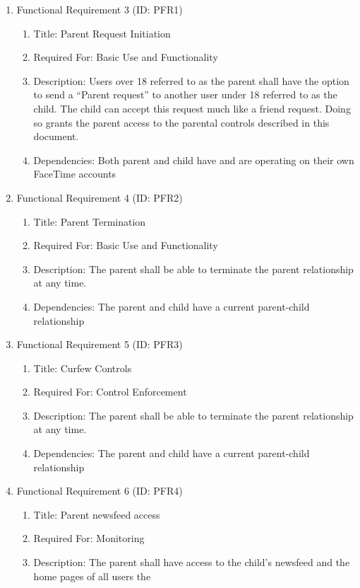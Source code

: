 \documentclass[12pt]{article}
\begin{document}
\begin{enumerate}
    \item Functional Requirement 3 (ID: PFR1)
    \begin{enumerate}
        \item Title: Parent Request Initiation
        \item Required For: Basic Use and Functionality
        \item Description: Users over 18 referred to as the parent shall have the option to send a “Parent request”
        to another user under 18 referred to as the child. The child can accept this request much like a friend
        request. Doing so grants the parent access to the parental controls described in this document.
        \item Dependencies: Both parent and child have and are operating on their own FaceTime accounts
    \end{enumerate}
    \item Functional Requirement 4 (ID: PFR2)
    \begin{enumerate}
        \item Title: Parent Termination
        \item Required For: Basic Use and Functionality
        \item Description: The parent shall be able to terminate the parent relationship at any time.
        \item Dependencies: The parent and child have a current parent-child relationship
    \end{enumerate}
    \item Functional Requirement 5 (ID: PFR3)
    \begin{enumerate}
        \item Title: Curfew Controls
        \item Required For: Control Enforcement
        \item Description: The parent shall be able to terminate the parent relationship at any time.
        \item Dependencies: The parent and child have a current parent-child relationship
    \end{enumerate}
    \item Functional Requirement 6 (ID: PFR4)
    \begin{enumerate}
        \item Title: Parent newsfeed access
        \item Required For: Monitoring
        \item Description: The parent shall have access to the child’s newsfeed and the home pages of all users the

\end{enumerate}
\end{enumerate}
\end{document}

